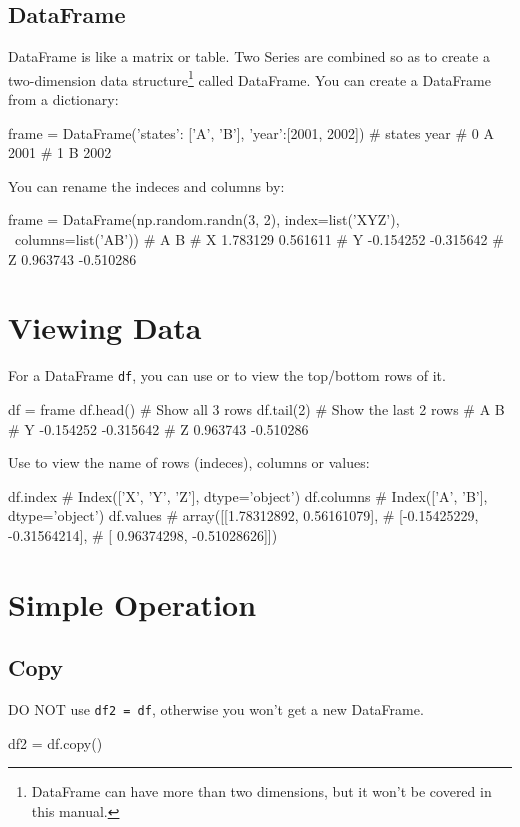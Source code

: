 \documentclass{report}
\begin{document}
\subsection{DataFrame}
DataFrame is like a matrix or table. Two Series are combined so as to create a two-dimension data structure\footnote{DataFrame can have more than two dimensions, but it won't be covered in this manual.} called DataFrame. You can create a DataFrame from a dictionary:
\begin{py}
frame = DataFrame({'states': ['A', 'B'], 'year':[2001, 2002]})
#   states  year
# 0      A  2001
# 1      B  2002
\end{py}

You can rename the indeces and columns by:
\begin{py}
frame = DataFrame(np.random.randn(3, 2), index=list('XYZ'),　\ 
        columns=list('AB'))
#           A         B
# X  1.783129  0.561611
# Y -0.154252 -0.315642
# Z  0.963743 -0.510286
\end{py}

\section{Viewing Data}
For a DataFrame \texttt{df}, you can use  or  to view the top/bottom rows of it. 
\begin{py}
df = frame
df.head()  # Show all 3 rows
df.tail(2) # Show the last 2 rows
#           A         B
# Y -0.154252 -0.315642
# Z  0.963743 -0.510286
\end{py}

Use  to view the name of rows (indeces), columns or values:
\begin{py}
df.index
# Index(['X', 'Y', 'Z'], dtype='object')
df.columns
# Index(['A', 'B'], dtype='object')
df.values
# array([[1.78312892,  0.56161079],
#       [-0.15425229, -0.31564214],
#       [ 0.96374298, -0.51028626]])
\end{py}

\section{Simple Operation}
\subsection{Copy}
DO NOT use \texttt{df2 = df}, otherwise you won't get a new DataFrame.
\begin{py}
df2 = df.copy()
\end{py}
\end{document}
